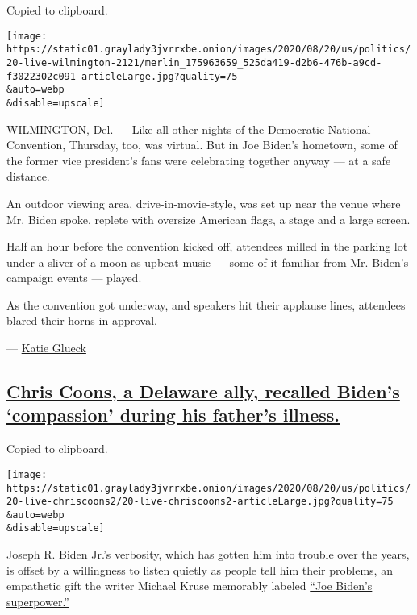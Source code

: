 Copied to clipboard.

\texttt{[image: https://static01.graylady3jvrrxbe.onion/images/2020/08/20/us/politics/20-live-wilmington-2121/merlin\_175963659\_525da419-d2b6-476b-a9cd-f3022302c091-articleLarge.jpg?quality=75\\\&auto=webp\\\&disable=upscale]}

WILMINGTON, Del. --- Like all other nights of the Democratic National
Convention, Thursday, too, was virtual. But in Joe Biden's hometown,
some of the former vice president's fans were celebrating together
anyway --- at a safe distance.

An outdoor viewing area, drive-in-movie-style, was set up near the venue
where Mr. Biden spoke, replete with oversize American flags, a stage and
a large screen.

Half an hour before the convention kicked off, attendees milled in the
parking lot under a sliver of a moon as upbeat music --- some of it
familiar from Mr. Biden's campaign events --- played.

As the convention got underway, and speakers hit their applause lines,
attendees blared their horns in approval.

--- \href{https://www.nytimes3xbfgragh.onion/by/katie-glueck}{Katie
Glueck}

\hypertarget{chris-coons-a-delaware-ally-recalled-bidens-compassion-during-his-fathers-illness}{%
\subsection{\texorpdfstring{\protect\hyperlink{chris-coons-a-delaware-ally-recalled-bidens-compassion-during-his-fathers-illness}{Chris
Coons, a Delaware ally, recalled Biden's `compassion' during his
father's
illness.}}{Chris Coons, a Delaware ally, recalled Biden's `compassion' during his father's illness.}}\label{chris-coons-a-delaware-ally-recalled-bidens-compassion-during-his-fathers-illness}}

Copied to clipboard.

\texttt{[image: https://static01.graylady3jvrrxbe.onion/images/2020/08/20/us/politics/20-live-chriscoons2/20-live-chriscoons2-articleLarge.jpg?quality=75\\\&auto=webp\\\&disable=upscale]}

Joseph R. Biden Jr.'s verbosity, which has gotten him into trouble over
the years, is offset by a willingness to listen quietly as people tell
him their problems, an empathetic gift the writer Michael Kruse
memorably labeled
\href{https://www.politico.com/magazine/story/2019/01/25/joe-biden-2019-profile-grief-beau-car-accident-224178}{``Joe
Biden's superpower.''}

